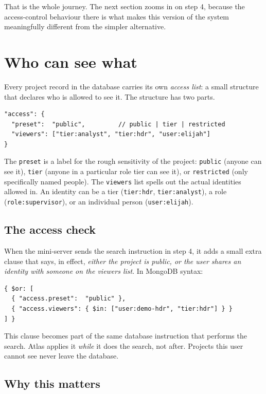 \documentclass[11pt,a4paper]{article}
\begin{document}
That is the whole journey. The next section zooms in on step 4, because the access-control behaviour there is what makes this version of the system meaningfully different from the simpler alternative.

\section{Who can see what}

Every project record in the database carries its own \emph{access list}: a small structure that declares who is allowed to see it. The structure has two parts.

\begin{lstlisting}
"access": {
  "preset":  "public",         // public | tier | restricted
  "viewers": ["tier:analyst", "tier:hdr", "user:elijah"]
}
\end{lstlisting}

The \texttt{preset} is a label for the rough sensitivity of the project: \texttt{public} (anyone can see it), \texttt{tier} (anyone in a particular role tier can see it), or \texttt{restricted} (only specifically named people). The \texttt{viewers} list spells out the actual identities allowed in. An identity can be a tier (\texttt{tier:hdr}, \texttt{tier:analyst}), a role (\texttt{role:supervisor}), or an individual person (\texttt{user:elijah}).

\subsection{The access check}

When the mini-server sends the search instruction in step 4, it adds a small extra clause that says, in effect, \emph{either the project is public, or the user shares an identity with someone on the viewers list}. In MongoDB syntax:

\begin{lstlisting}
{ $or: [
  { "access.preset":  "public" },
  { "access.viewers": { $in: ["user:demo-hdr", "tier:hdr"] } }
] }
\end{lstlisting}

This clause becomes part of the same database instruction that performs the search. Atlas applies it \emph{while} it does the search, not after. Projects this user cannot see never leave the database.

\subsection{Why this matters}
\end{document}
